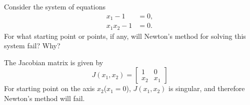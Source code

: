 \begin{pro}
  Consider the system of equations
  \begin{align*}
    x_1 - 1 &= 0, \\
    x_1x_2 - 1 &= 0.
  \end{align*}
  For what starting point or points,
  if any,
  will Newton's method for solving this system fail?
  Why?
\end{pro}

\begin{sol}
  The Jacobian matrix is given by
  \begin{displaymath}
    J(x_1, x_2) =
    \begin{bmatrix}
      1 & 0 \\
      x_2 & x_1
    \end{bmatrix}
  \end{displaymath}
  For starting point on the axis $x_2$($x_1=0$),
  $J(x_1, x_2)$ is singular,
  and therefore Newton's method will fail.
\end{sol}
